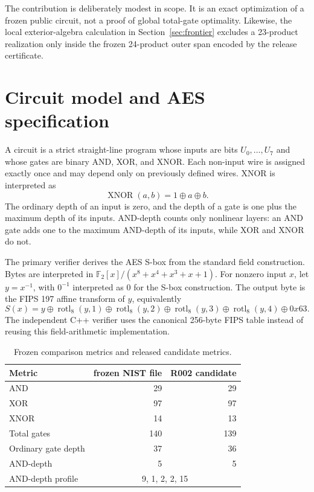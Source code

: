 \documentclass[11pt]{article}
\newcommand{\F}{\mathbb{F}}
\newcommand{\xor}{\mathbin{\oplus}}
\begin{document}
The contribution is deliberately modest in scope.  It is an exact optimization of a frozen public circuit, not a proof of global total-gate optimality.  Likewise, the local exterior-algebra calculation in Section~\ref{sec:frontier} excludes a 23-product realization only inside the frozen 24-product outer span encoded by the release certificate.

\section{Circuit model and AES specification}
A circuit is a strict straight-line program whose inputs are bits \(U_0,\ldots,U_7\) and whose gates are binary AND, XOR, and XNOR.  Each non-input wire is assigned exactly once and may depend only on previously defined wires.  XNOR is interpreted as
\[
  \operatorname{XNOR}(a,b)=1\xor a\xor b.
\]
The ordinary depth of an input is zero, and the depth of a gate is one plus the maximum depth of its inputs.  AND-depth counts only nonlinear layers: an AND gate adds one to the maximum AND-depth of its inputs, while XOR and XNOR do not.

The primary verifier derives the AES S-box from the standard field construction.  Bytes are interpreted in \(\F_2[x]/(x^8+x^4+x^3+x+1)\).  For nonzero input \(x\), let \(y=x^{-1}\), with \(0^{-1}\) interpreted as 0 for the S-box construction.  The output byte is the FIPS 197 affine transform of \(y\), equivalently
\[
S(x)=y\xor \operatorname{rotl}_8(y,1)\xor\operatorname{rotl}_8(y,2)
      \xor\operatorname{rotl}_8(y,3)\xor\operatorname{rotl}_8(y,4)\xor 0x63.
\]
The independent C++ verifier uses the canonical 256-byte FIPS table instead of reusing this field-arithmetic implementation.

\begin{table}[t]
\centering
\begin{tabular}{lrr}
\toprule
Metric & frozen NIST file & R002 candidate\\
\midrule
AND & 29 & 29\\
XOR & 97 & 97\\
XNOR & 14 & 13\\
Total gates & 140 & 139\\
Ordinary gate depth & 37 & 36\\
AND-depth & 5 & 5\\
AND-depth profile & \multicolumn{2}{c}{9, 1, 2, 2, 15}\\
\bottomrule
\end{tabular}
\caption{Frozen comparison metrics and released candidate metrics.}
\label{tab:metrics}
\end{table}
\end{document}
